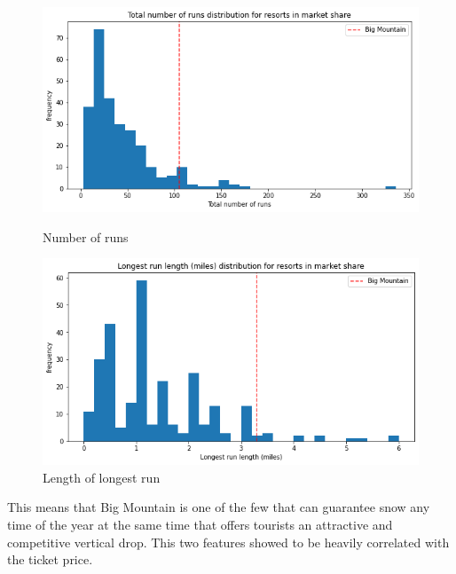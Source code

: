 \documentclass[twocolumn, 12pt]{article}
\begin{document}
\begin{figure}[!htb]
	\begin{minipage}{0.24\textwidth}
		\centering
		\includegraphics[width=\linewidth]{totalnumberruns.png}
		\caption{Number of runs}\label{numberruns}
	\end{minipage}\hfill
	\begin {minipage}{0.24\textwidth}
	\centering
	\includegraphics[width=\linewidth]{longestrun.png}
	\caption{Length of longest run}\label{runlength}
	\end{minipage}
\end{figure}

This means that Big Mountain is one of the few that can guarantee snow any time of the year at the same time that offers tourists an attractive and competitive vertical drop. This two features showed to be heavily correlated with the ticket price.  \linebreak \linebreak \linebreak
\end{document}
